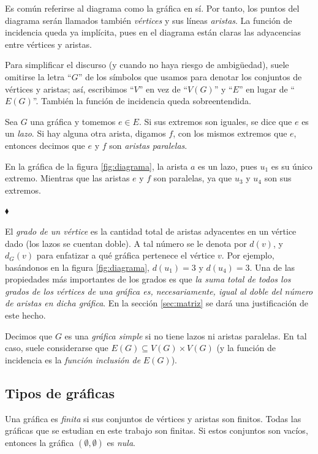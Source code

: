 Es común referirse al diagrama como la gráfica en sí. Por tanto, los puntos del diagrama serán llamados también \textit{vértices} y sus líneas \textit{aristas}. La función de incidencia queda ya implícita, pues en el diagrama están claras las adyacencias entre vértices y aristas.

Para simplificar el discurso (y cuando no haya riesgo de ambigüedad), suele omitirse la letra ``$G$'' de los símbolos que usamos para denotar los conjuntos de vértices y aristas; así, escribimos ``$V$'' en vez de ``$V(G)$'' y ``$E$'' en lugar de ``$E(G)$''. También la función de incidencia queda sobreentendida.

Sea $G$ una gráfica y tomemos $e \in E$. Si sus extremos son iguales, se dice que $e$ es un \textit{lazo}. Si hay alguna otra arista, digamos $f$, con los mismos extremos que $e$, entonces decimos que $e$ y $f$ son \textit{aristas paralelas}.
\begin{ejem}
En la gráfica de la figura \ref{fig:diagrama}, la arista $a$ es un lazo, pues $u_{1}$ es su único extremo. Mientras que las aristas $e$ y $f$ son paralelas, ya que $u_{3}$ y $u_{4}$ son sus extremos.

\hfill $\blacklozenge$
\end{ejem}
El \textit{grado de un vértice}  es la cantidad total de aristas adyacentes en un vértice dado (los lazos se cuentan doble). A tal número se le denota por $d(v)$, y  $d_{G}(v)$ para enfatizar a qué gráfica pertenece el vértice $v$. Por ejemplo, basándonos en la figura \ref{fig:diagrama}, $d(u_{1})=3$ y $d(u_{4}) = 3$. Una de las propiedades más importantes de los grados es que \textit{la suma total de todos los grados de los vértices de una gráfica es, necesariamente, igual al doble del número de aristas en dicha gráfica}. En la sección \ref{sec:matriz} se dará una justificación de este hecho.

Decimos que $G$ es una \textit{gráfica simple} si no tiene lazos ni aristas paralelas. En tal caso, suele considerarse que $E(G) \subseteq V(G) \times V(G)$ (y la función de incidencia es la \textit{función inclusión de} $E(G)$). 

        \subsection{Tipos de gráficas} \label{sec:tiposdegraficas}
Una gráfica es \textit{finita} si sus conjuntos de vértices y aristas son finitos. Todas las gráficas que se estudian en este trabajo son finitas. Si estos conjuntos son vacíos, entonces la gráfica $(\emptyset, \emptyset)$ es \textit{nula}. 

